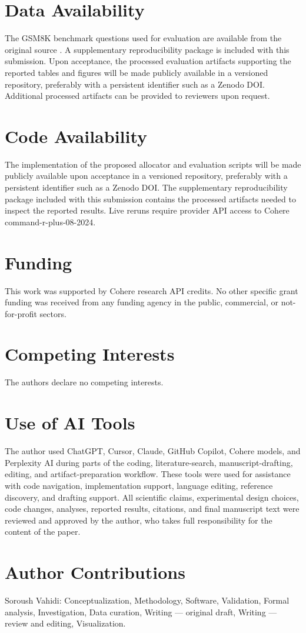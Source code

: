 

\section*{Data Availability}
The GSM8K benchmark questions used for evaluation are available from the original source
\citep{cobbe2021training}. A supplementary reproducibility package is included with this
submission. Upon acceptance, the processed evaluation artifacts supporting the reported
tables and figures will be made publicly available in a versioned repository, preferably
with a persistent identifier such as a Zenodo DOI. Additional processed artifacts can be
provided to reviewers upon request.

\section*{Code Availability}
The implementation of the proposed allocator and evaluation scripts will be made publicly
available upon acceptance in a versioned repository, preferably with a persistent
identifier such as a Zenodo DOI. The supplementary reproducibility package included with
this submission contains the processed artifacts needed to inspect the reported results.
Live reruns require provider API access to Cohere command-r-plus-08-2024.

\section*{Funding}
This work was supported by Cohere research API credits. No other specific grant
funding was received from any funding agency in the public, commercial, or
not-for-profit sectors.

\section*{Competing Interests}
The authors declare no competing interests.

\section*{Use of AI Tools}
The author used ChatGPT, Cursor, Claude, GitHub Copilot, Cohere models, and Perplexity AI during parts of the coding, literature-search, manuscript-drafting, editing, and artifact-preparation workflow. These tools were used for assistance with code navigation, implementation support, language editing, reference discovery, and drafting support. All scientific claims, experimental design choices, code changes, analyses, reported results, citations, and final manuscript text were reviewed and approved by the author, who takes full responsibility for the content of the paper.

\section*{Author Contributions}
Soroush Vahidi: Conceptualization, Methodology, Software, Validation, Formal analysis,
Investigation, Data curation, Writing --- original draft, Writing --- review and editing,
Visualization.
